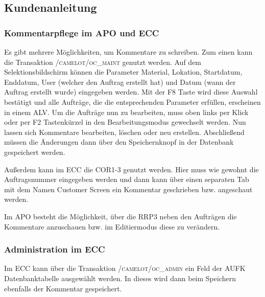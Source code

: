 \subsection{Kundenanleitung}
\label{app:Kundenanleitung}

\subsubsection{Kommentarpflege im APO und ECC}
Es gibt mehrere Möglichkeiten, um Kommentare zu schreiben.
Zum einen kann die Transaktion \textsc{/camelot/oc\_maint} genutzt werden. Auf dem Selektionsbildschirm können die Parameter Material, Lokation, Startdatum, Enddatum, User (welcher den Auftrag erstellt hat) und Datum (wann der Auftrag erstellt wurde) eingegeben werden. Mit der F8 Taste wird diese Auswahl bestätigt und alle Aufträge, die die entsprechenden Parameter erfüllen, erscheinen in einem \ac{ALV}. Um die Aufträge nun zu bearbeiten, muss oben links per Klick oder per F2 Tastenkürzel in den Bearbeitungsmodus gewechselt werden. Nun lassen sich Kommentare bearbeiten, löschen oder neu erstellen. Abschließend müssen die Änderungen dann über den Speichernknopf in der Datenbank gespeichert werden.

Außerdem kann im ECC die COR1-3 genutzt werden. Hier muss wie gewohnt die Auftragsnummer eingegeben werden und dann kann über einen separaten Tab mit dem Namen Customer Screen ein Kommentar geschrieben bzw. angeschaut werden.

Im APO besteht die Möglichkeit, über die RRP3 neben den Aufträgen die Kommentare anzuschauen bzw. im Editiermodus diese zu verändern.
 
\subsubsection{Administration im ECC}
Im ECC kann über die Transaktion \textsc{/camelot/oc\_admin} ein Feld der AUFK Datenbanktabelle ausgewählt werden. In dieses wird dann beim Speichern ebenfalls der Kommentar gespeichert.